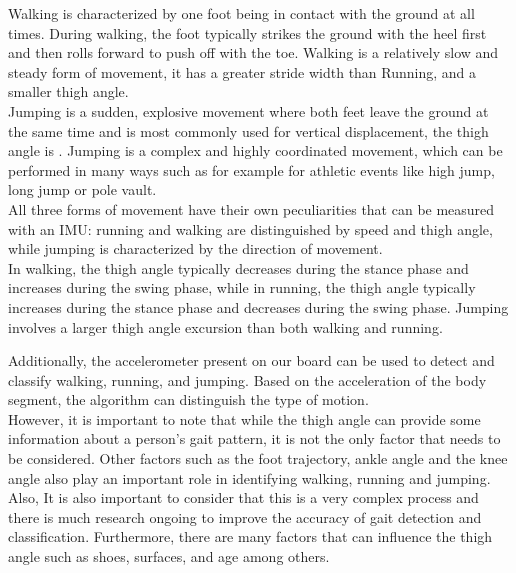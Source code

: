 Walking is characterized by one foot being in contact with the ground at all times. During walking, the foot typically strikes the ground with the heel first and then rolls forward to push off with the toe. Walking is a relatively slow and steady form of movement, it has a greater stride width than Running, and a smaller thigh angle.\\

Jumping is a sudden, explosive movement where both feet leave the ground at the same time and is most commonly used for vertical displacement, the thigh angle is . Jumping is a complex and highly coordinated movement, which can be performed in many ways such as for example for athletic events like high jump, long jump or pole vault. \\

All three forms of movement have their own peculiarities that can be measured with an IMU: running and walking are distinguished by speed and thigh angle, while jumping is characterized by the direction of movement.\\
In walking, the thigh angle typically decreases during the stance phase and increases during the swing phase, while in running, the thigh angle typically increases during the stance phase and decreases during the swing phase. Jumping involves a larger thigh angle excursion than both walking and running.

Additionally, the accelerometer present on our board can be used to detect and classify walking, running, and jumping. Based on the acceleration of the body segment, the algorithm can distinguish the type of motion.\\

However, it is important to note that while the thigh angle can provide some information about a person's gait pattern, it is not the only factor that needs to be considered. Other factors such as the foot trajectory, ankle angle and the knee angle also play an important role in identifying walking, running and jumping. Also, It is also important to consider that this is a very complex process and there is much research ongoing to improve the accuracy of gait detection and classification. Furthermore, there are many factors that can influence the thigh angle such as shoes, surfaces, and age among others.




